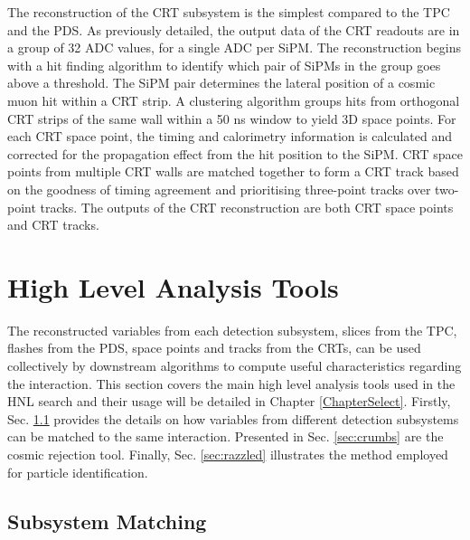 The reconstruction of the CRT subsystem is the simplest compared to the TPC and the PDS.
As previously detailed, the output data of the CRT readouts are in a group of 32 ADC values, for a single ADC per SiPM.
The reconstruction begins with a hit finding algorithm to identify which pair of SiPMs in the group goes above a threshold.
The SiPM pair determines the lateral position of a cosmic muon hit within a CRT strip.
A clustering algorithm groups hits from orthogonal CRT strips of the same wall within a 50 ns window to yield 3D space points.
For each CRT space point, the timing and calorimetry information is calculated and corrected for the propagation effect from the hit position to the SiPM.
CRT space points from multiple CRT walls are matched together to form a CRT track based on the goodness of timing agreement and prioritising three-point tracks over two-point tracks.
The outputs of the CRT reconstruction are both CRT space points and CRT tracks. 

\section{High Level Analysis Tools}
\label{sec:reco_ana_tools}

The reconstructed variables from each detection subsystem, slices from the TPC, flashes from the PDS, space points and tracks from the CRTs, can be used collectively by downstream algorithms to compute useful characteristics regarding the interaction.
This section covers the main high level analysis tools used in the HNL search and their usage will be detailed in Chapter \ref{ChapterSelect}.
Firstly, Sec. \ref{sec:subsystem_match} provides the details on how variables from different detection subsystems can be matched to the same interaction.
Presented in Sec. \ref{sec:crumbs} are the cosmic rejection tool.
Finally, Sec. \ref{sec:razzled} illustrates the method employed for particle identification.

\subsection{Subsystem Matching}
\label{sec:subsystem_match}

